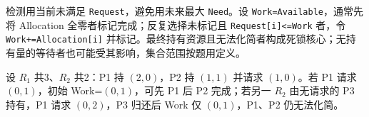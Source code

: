 检测用当前未满足 \texttt{Request}，避免用未来最大 \texttt{Need}。设 \texttt{Work=\allowbreak{}Available}，通常先将 Allocation 全零者标记完成；反复选择未标记且 \texttt{Request[\allowbreak{}i]\allowbreak{}<\allowbreak{}=\allowbreak{}Work} 者，令 \texttt{Work+\allowbreak{}=\allowbreak{}Allocation[\allowbreak{}i]\allowbreak{}} 并标记。最终持有资源且无法化简者构成死锁核心；无持有量的等待者也可能受其影响，集合范围按题用定义。

设 \(R_1\) 共3、\(R_2\) 共2：P1 持 \((2,0)\)，P2 持 \((1,1)\) 并请求 \((1,0)\)。若 P1 请求 \((0,1)\)，初始 Work=\((0,1)\)，可先 P1 后 P2 完成；若另一 \(R_2\) 由无请求的 P3 持有，P1 请求 \((0,2)\)，P3 归还后 Work 仅 \((0,1)\)，P1、P2 仍无法化简。
